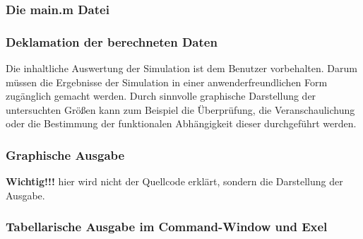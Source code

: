 \subsubsection*{Die main.m Datei}
\subsubsection{Deklamation der berechneten Daten}

Die inhaltliche Auswertung der Simulation ist dem Benutzer vorbehalten. Darum
müssen die Ergebnisse der Simulation in einer anwenderfreundlichen Form
zugänglich gemacht werden. Durch sinnvolle graphische Darstellung der
untersuchten Größen kann zum Beispiel die Überprüfung, die Veranschaulichung
oder die Bestimmung der funktionalen Abhängigkeit dieser durchgeführt werden.


\subsubsection*{Graphische Ausgabe}
\textbf{Wichtig!!!} hier wird nicht der Quellcode erklärt, sondern die
Darstellung der Ausgabe.  
\subsubsection{Tabellarische Ausgabe im Command-Window und Exel}

